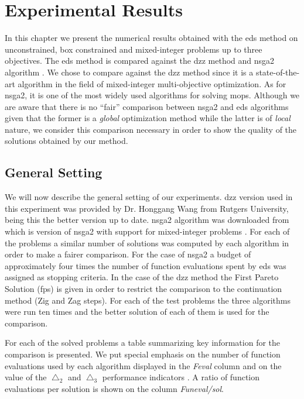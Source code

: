 \section{Experimental Results}
\label{sec:results}

In this chapter we present the numerical results obtained with the \gls{eds} method on unconstrained, box constrained and mixed-integer problems up to three objectives. The \gls{eds} method is compared against the \gls{dzz} method \cite{zigzag_discrete} and \gls{nsga2} algorithm \cite{nsga2}. We chose to compare against the \gls{dzz} method since it is a state-of-the-art algorithm in the field of mixed-integer multi-objective optimization. As for \gls{nsga2}, it is one of the most widely used algorithms for solving \glspl{mop}. Although we are aware that there is no ``fair'' comparison between \gls{nsga2} and \gls{eds} algorithms given that the former is a \emph{global} optimization method while the latter is of \emph{local} nature, we consider this comparison necessary in order to show the quality of the solutions obtained by our method. 

\subsection{General Setting}

We will now describe the general setting of our experiments. \gls{dzz} version used in this experiment was provided by Dr. Honggang Wang from Rutgers University, being this the better version up to date. \gls{nsga2} algorithm was downloaded from \cite{ngpm_code} which is version of \gls{nsga2} with support for mixed-integer problems \cite{ngpm}. For each of the problems a similar number of solutions was computed by each algorithm in order to make a fairer comparison. For the case of \gls{nsga2} a budget of approximately four times the number of function evaluations spent by \gls{eds} was assigned as stopping criteria. In the case of the \gls{dzz} method the First Pareto Solution (\gls{fps}) is given in order to restrict the comparison to the continuation method (Zig and Zag steps). For each of the test problems the three algorithms were run ten times and the better solution of each of them is used for the comparison.

For each of the solved problems a table summarizing key information for the comparison is presented. We put special emphasis on the number of function evaluations used by each algorithm displayed in the \emph{Feval} column and on the value of the $\bigtriangleup_2$ and $\bigtriangleup_3$ performance indicators \cite{delta_p}. A ratio of function evaluations per solution is shown on the column \emph{Funeval/sol}.

